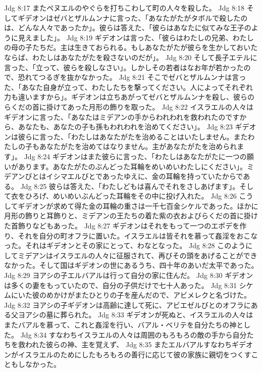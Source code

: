 Jdg 8:17  またペヌエルのやぐらを打ちこわして町の人々を殺した。
Jdg 8:18  そしてギデオンはゼバとザルムンナに言った、「あなたがたがタボルで殺したのは、どんな人々であったか」。彼らは答えた、「彼らはあなたに似てみな王子のように見えました」。
Jdg 8:19  ギデオンは言った、「彼らはわたしの兄弟、わたしの母の子たちだ。主は生きておられる。もしあなたがたが彼らを生かしておいたならば、わたしはあなたがたを殺さないのだが」。
Jdg 8:20  そして長子エテルに言った、「立って、彼らを殺しなさい」。しかしその若者はなお年が若かったので、恐れてつるぎを抜かなかった。
Jdg 8:21  そこでゼバとザルムンナは言った、「あなた自身が立って、わたしたちを撃ってください。人によってそれぞれ力も違いますから」。ギデオンは立ちあがってゼバとザルムンナを殺し、彼らのらくだの首に掛けてあった月形の飾りを取った。
Jdg 8:22  イスラエルの人々はギデオンに言った、「あなたはミデアンの手からわれわれを救われたのですから、あなたも、あなたの子も孫もわれわれを治めてください」。
Jdg 8:23  ギデオンは彼らに言った、「わたしはあなたがたを治めることはいたしません。またわたしの子もあなたがたを治めてはなりません。主があなたがたを治められます」。
Jdg 8:24  ギデオンはまた彼らに言った、「わたしはあなたがたに一つの願いがあります。あなたがたのぶんどった耳輪をめいめいわたしにください」。ミデアンびとはイシマエルびとであったゆえに、金の耳輪を持っていたからである。
Jdg 8:25  彼らは答えた、「わたしどもは喜んでそれをさしあげます」。そして衣をひろげ、めいめいぶんどった耳輪をその中に投げ入れた。
Jdg 8:26  こうしてギデオンが求めて得た金の耳輪の重さは一千七百金シケルであった。ほかに月形の飾りと耳飾りと、ミデアンの王たちの着た紫の衣およびらくだの首に掛けた首飾りなどもあった。
Jdg 8:27  ギデオンはそれをもって一つのエポデを作り、それを自分の町オフラに置いた。イスラエルは皆それを慕って姦淫をおこなった。それはギデオンとその家にとって、わなとなった。
Jdg 8:28  このようにしてミデアンはイスラエルの人々に征服されて、再びその頭をあげることができなかった。そして国はギデオンの世にあるうち、四十年のあいだ太平であった。
Jdg 8:29  ヨアシの子エルバアルは行って自分の家に住んだ。
Jdg 8:30  ギデオンは多くの妻をもっていたので、自分の子供だけで七十人あった。
Jdg 8:31  シケムにいた彼のめかけがまたひとりの子を産んだので、アビメレクと名づけた。
Jdg 8:32  ヨアシの子ギデオンは高齢に達して死に、アビエゼルびとのオフラにある父ヨアシの墓に葬られた。
Jdg 8:33  ギデオンが死ぬと、イスラエルの人々はまたバアルを慕って、これと姦淫を行い、バアル・ベリテを自分たちの神とした。
Jdg 8:34  すなわちイスラエルの人々は周囲のもろもろの敵の手から自分たちを救われた彼らの神、主を覚えず、
Jdg 8:35  またエルバアルすなわちギデオンがイスラエルのためにしたもろもろの善行に応じて彼の家族に親切をつくすこともしなかった。
